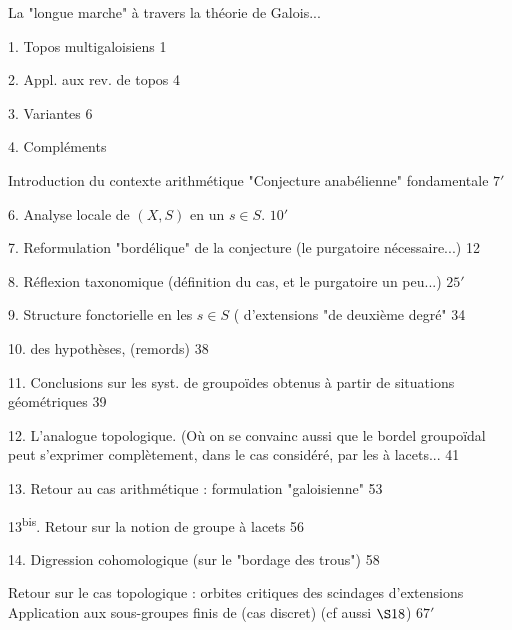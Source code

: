 
La "longue marche" à travers la théorie de Galois...

1. Topos multigaloisiens \hfill 1

2. Appl. aux rev. de topos \hfill 4

3. Variantes  \hfill 6

4. Compléments 


 Introduction du contexte arithmétique
"Conjecture anabélienne" fondamentale \hfill \(7'\)

6. Analyse locale de \((X,S)\) en un \(s\in S\). \hfill \(10'\)

7. Reformulation "bordélique" de la conjecture
(le purgatoire nécessaire...) \hfill 12

8. Réflexion taxonomique (définition du cas, et le purgatoire
 un peu...) \hfill \(25'\)

9. Structure fonctorielle en les \(s\in S\)
( d'extensions "de deuxième degré" \hfill 34

10.  des hypothèses, (remords) \hfill 38

11. Conclusions sur les syst. de groupoïdes obtenus à partir de
situations géométriques \hfill 39

12. L'analogue topologique. (Où on se convainc aussi que le bordel
groupoïdal peut s'exprimer complètement, dans le cas considéré,
par les  à lacets... \hfill 41

13. Retour au cas arithmétique : formulation "galoisienne" \hfill 53

13\textsuperscript{bis}. Retour sur la notion de groupe à lacets \hfill 56

14. Digression cohomologique (sur le "bordage des trous") \hfill 58

 Retour sur le cas topologique : orbites critiques
 des scindages d'extensions
Application aux sous-groupes finis de
 (cas discret)
(cf aussi \(\S 18\)) \hfill \(67'\)

